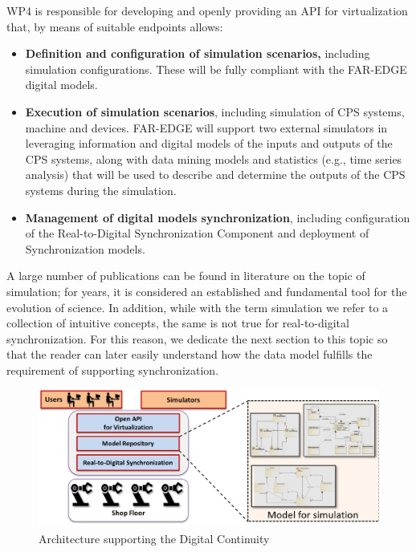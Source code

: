 WP4 is responsible for developing and openly providing an API for virtualization that, by means of suitable endpoints allows: 
\begin{itemize}
    \item \textbf{Definition and configuration of simulation scenarios,} including simulation configurations. These will be fully compliant with the FAR-EDGE digital models.
    \item \textbf{Execution of simulation scenarios}, including simulation of CPS systems, machine and devices. FAR-EDGE will support two external simulators in leveraging information and digital models of the inputs and outputs of the CPS systems, along with data mining models and statistics (e.g., time series analysis) that will be used to describe and determine the outputs of the CPS systems during the simulation.
    \item \textbf{Management of digital models synchronization}, including configuration of the Real-to-Digital Synchronization Component and deployment of Synchronization models. 
\end{itemize}


A large number of publications can be found in literature on the topic of simulation; for years, it is considered an established and fundamental tool for the evolution of science. In addition, while with the term simulation we refer to a collection of intuitive concepts, the same is not true for real-to-digital synchronization. For this reason, we dedicate the next section to this topic so that the reader can later easily understand how the data model fulfills the requirement of supporting synchronization.

\begin{figure}
	\centering
	\includegraphics[width=\linewidth]{images/Architecture}
	\caption{Architecture supporting the Digital Continuity}
	\label{fig:architectureSimulation}
\end{figure}

